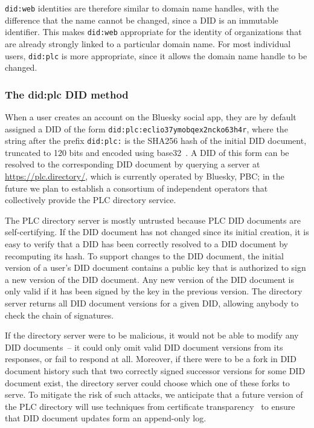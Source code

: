\documentclass[sigconf,review]{acmart}
\begin{document}
\texttt{did:web} identities are therefore similar to domain name handles, with the difference that the name cannot be changed, since a DID is an immutable identifier.
This makes \texttt{did:web} appropriate for the identity of organizations that are already strongly linked to a particular domain name.
For most individual users, \texttt{did:plc} is more appropriate, since it allows the domain name handle to be changed.

\subsubsection{The did:plc DID method}

When a user creates an account on the Bluesky social app, they are by default assigned a DID of the form \texttt{did:plc:eclio37ymobqex2ncko63h4r}, where the string after the prefix \texttt{did:plc:} is the SHA256 hash of the initial DID document, truncated to 120 bits and encoded using base32~\cite{did:plc}.
A DID of this form can be resolved to the corresponding DID document by querying a server at \url{https://plc.directory/}, which is currently operated by Bluesky, PBC; in the future we plan to establish a consortium of independent operators that collectively provide the PLC directory service.

The PLC directory server is mostly untrusted because PLC DID documents are self-certifying.
If the DID document has not changed since its initial creation, it is easy to verify that a DID has been correctly resolved to a DID document by recomputing its hash.
To support changes to the DID document, the initial version of a user's DID document contains a public key that is authorized to sign a new version of the DID document.
Any new version of the DID document is only valid if it has been signed by the key in the previous version.
The directory server returns all DID document versions for a given DID, allowing anybody to check the chain of signatures.

If the directory server were to be malicious, it would not be able to modify any DID documents~-- it could only omit valid DID document versions from its responses, or fail to respond at all.
Moreover, if there were to be a fork in DID document history such that two correctly signed successor versions for some DID document exist, the directory server could choose which one of these forks to serve.
To mitigate the risk of such attacks, we anticipate that a future version of the PLC directory will use techniques from certificate transparency~\cite{Laurie:2014} to ensure that DID document updates form an append-only log.
\end{document}
